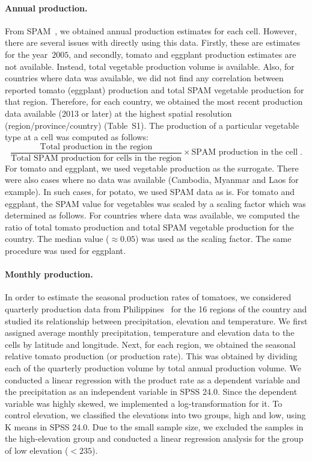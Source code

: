 \documentclass[10pt]{article}
\theoremstyle{definition}
\begin{document}
\paragraph{Annual production.} From SPAM~\cite{spam}, we obtained annual
production estimates for each cell.  However, there are several issues with
directly using this data. Firstly, these are estimates for the year~$2005$,
and secondly, tomato and eggplant production estimates are not available.
Instead, total vegetable production volume is available. Also, for
countries where data was available, we did not find any correlation between
reported tomato (eggplant) production and total SPAM vegetable production
for that region. Therefore, for each country, we obtained the most recent
production data available (2013 or later) at the highest spatial resolution
(region/province/country) (Table~S1). The production of a particular
vegetable type at a cell was computed as follows:
\[\frac{\text{Total production in the region}}{\text{Total SPAM production
    for cells in the region}}\times \text{SPAM production in the cell} \;.\]
For tomato and eggplant, we used vegetable production as the surrogate.
There were also cases where no data was available (Cambodia, Myanmar and
Laos for example). In such cases, for potato, we used SPAM data as is. For
tomato and eggplant, the SPAM value for vegetables was scaled by a scaling
factor which was determined as follows. For countries where data was
available, we computed the ratio of total tomato production and total SPAM
vegetable production for the country. The median value ($\approx0.05$) was
used as the scaling factor. The same procedure was used for eggplant. 

\paragraph{Monthly production.} In order to estimate the seasonal production rates of tomatoes, we
considered quarterly production data from Philippines~\cite{psa2017} for the 16
regions of the country and studied its relationship between precipitation,
elevation and temperature. We first assigned average monthly precipitation,
temperature and elevation data to the cells by latitude and longitude.
Next, for each region, we obtained the seasonal relative tomato production
(or production rate). This was obtained by dividing each of the quarterly
production volume by total annual production volume. We conducted a linear
regression with the product rate as a dependent variable and the
precipitation as an independent variable in SPSS 24.0. Since the dependent
variable was highly skewed, we implemented a log-transformation for it. To
control elevation, we classified the elevations into two groups, high and
low, using K means in SPSS 24.0. Due to the small sample size, we excluded
the samples in the high-elevation group and conducted a linear regression
analysis for the group of low elevation ($< 235$). 
\end{document}
